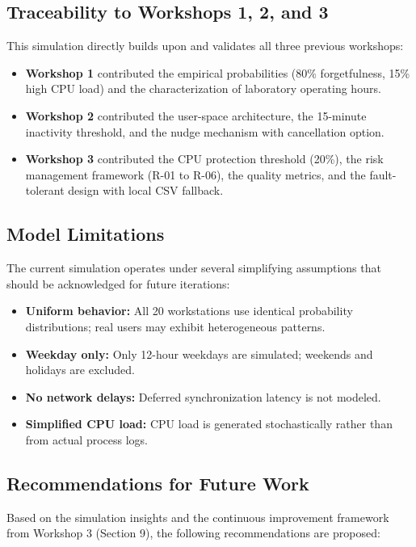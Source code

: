 \documentclass[12pt,a4paper]{article}
\begin{document}
\subsection{Traceability to Workshops 1, 2, and 3}

This simulation directly builds upon and validates all three previous workshops:

\begin{itemize}
    \item \textbf{Workshop 1} contributed the empirical probabilities (80\% forgetfulness, 15\% high CPU load) and the characterization of laboratory operating hours.
    \item \textbf{Workshop 2} contributed the user-space architecture, the 15-minute inactivity threshold, and the nudge mechanism with cancellation option.
    \item \textbf{Workshop 3} contributed the CPU protection threshold (20\%), the risk management framework (R-01 to R-06), the quality metrics, and the fault-tolerant design with local CSV fallback.
\end{itemize}

\subsection{Model Limitations}

The current simulation operates under several simplifying assumptions that should be acknowledged for future iterations:

\begin{itemize}
    \item \textbf{Uniform behavior:} All 20 workstations use identical probability distributions; real users may exhibit heterogeneous patterns.
    \item \textbf{Weekday only:} Only 12-hour weekdays are simulated; weekends and holidays are excluded.
    \item \textbf{No network delays:} Deferred synchronization latency is not modeled.
    \item \textbf{Simplified CPU load:} CPU load is generated stochastically rather than from actual process logs.
\end{itemize}

\subsection{Recommendations for Future Work}

Based on the simulation insights and the continuous improvement framework from Workshop 3 (Section 9), the following recommendations are proposed:
\end{document}
